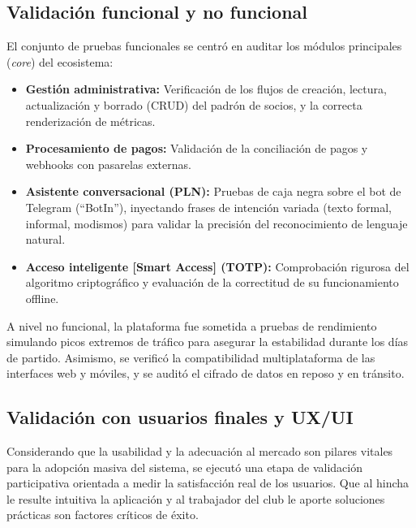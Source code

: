 \subsection{Validación funcional y no funcional}

El conjunto de pruebas funcionales se centró en auditar los módulos principales (\textit{core}) del ecosistema:

\begin{itemize}
    \item \textbf{Gestión administrativa:} Verificación de los flujos de creación, lectura, actualización y borrado (CRUD) del padrón de socios, y la correcta renderización de métricas.
    \item \textbf{Procesamiento de pagos:} Validación de la conciliación de pagos y webhooks con pasarelas externas.
    \item \textbf{Asistente conversacional (PLN):} Pruebas de caja negra sobre el bot de Telegram (``BotIn''), inyectando frases de intención variada (texto formal, informal, modismos) para validar la precisión del reconocimiento de lenguaje natural.
    \item \textbf{Acceso inteligente [Smart Access] (TOTP):} Comprobación rigurosa del algoritmo criptográfico y evaluación de la correctitud de su funcionamiento offline.
\end{itemize}

A nivel no funcional, la plataforma fue sometida a pruebas de rendimiento simulando picos extremos de tráfico para asegurar la estabilidad durante los días de partido. Asimismo, se verificó la compatibilidad multiplataforma de las interfaces web y móviles, y se auditó el cifrado de datos en reposo y en tránsito.

\subsection{Validación con usuarios finales y UX/UI}

Considerando que la usabilidad y la adecuación al mercado son pilares vitales para la adopción masiva del sistema, se ejecutó una etapa de validación participativa orientada a medir la satisfacción real de los usuarios. Que al hincha le resulte intuitiva la aplicación y al trabajador del club le aporte soluciones prácticas son factores críticos de éxito.

